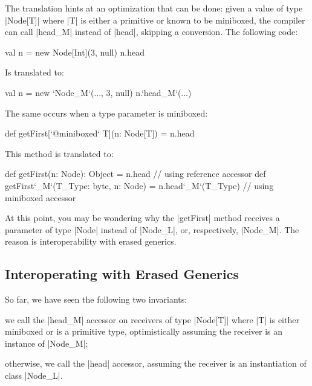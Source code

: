 The translation hints at an optimization that can be done: given a value of type |Node[T]| where |T| is either a primitive or known to be miniboxed, the compiler can call |head_M| instead of |head|, skipping a conversion. The following code:

\begin{lstlisting-nobreak}
 val n = new Node[Int](3, null)
 n.head
\end{lstlisting-nobreak}

Is translated to:

\begin{lstlisting-nobreak}
 val n = new `Node_M`(..., 3, null)
 n.`head_M`(...)
\end{lstlisting-nobreak}

The same occurs when a type parameter is miniboxed:

\begin{lstlisting-nobreak}
 def getFirst[`@miniboxed` T](n: Node[T]) = n.head
\end{lstlisting-nobreak}

This method is translated to:

\begin{lstlisting-nobreak}
 def getFirst(n: Node): Object =
   n.head                 // using reference accessor
 def getFirst`_M`(T_Type: byte, n: Node) =
   n.head`_M`(T_Type) // using miniboxed accessor
\end{lstlisting-nobreak}

At this point, you may be wondering why the |getFirst| method receives a parameter of type |Node| instead of |Node_L|, or, respectively, |Node_M|. The reason is interoperability with erased generics.

\vspace{-0.3em}

\subsection{Interoperating with Erased Generics}
\vspace{-0.2em}

So far, we have seen the following two invariants:
\begin{compactitem}
 \item we call the |head_M| accessor on receivers of type |Node[T]| where |T| is either miniboxed or is a primitive type, optimistically assuming the receiver is an instance of |Node_M|;
 \item otherwise, we call the |head| accessor, assuming the receiver is an instantiation of class |Node_L|.
\end{compactitem}

